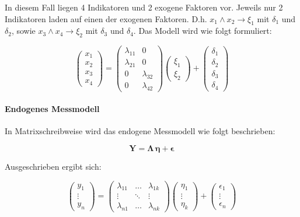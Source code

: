 \documentclass{article}
\numberwithin{equation}{section}
\begin{document}
In diesem Fall liegen 4 Indikatoren und 2 exogene Faktoren vor. Jeweils nur 2 Indikatoren laden auf einen der exogenen Faktoren. D.h. $x_1 \wedge x_2 \to \xi_1$ mit $\delta_1$ und $\delta_2$, sowie $x_3 \wedge x_4 \to \xi_2$ mit $\delta_3$ und $\delta_4$. Das Modell wird wie folgt formuliert:

\begin{equation}
\begin{pmatrix}x_1\\ x_2\\ x_3\\ x_4\end{pmatrix} = 
\begin{pmatrix}\lambda_{11} & 0\\ \lambda_{21} & 0 \\ 0 & \lambda_{32}\\ 0 & \lambda_{42} \end{pmatrix}
\begin{pmatrix}\xi_1\\ \xi_2\end{pmatrix} +
\begin{pmatrix}\delta_1\\ \delta_2\\ \delta_3\\ \delta_4\end{pmatrix}
\end{equation}

\paragraph*{Endogenes Messmodell}

In Matrixschreibweise wird das endogene Messmodell wie folgt beschrieben:

\begin{equation}
\mathbf{Y} = \boldsymbol{\Lambda \, \eta} + \boldsymbol\epsilon
\end{equation}

Ausgeschrieben ergibt sich:

\begin{equation}
\begin{pmatrix}y_1\\ \vdots\\ y_n\end{pmatrix} = 
\begin{pmatrix}\lambda_{11} & \hdots & \lambda_{1k}\\ \vdots & \ddots & \vdots \\ \lambda_{n1} & \hdots & \lambda_{nk} \end{pmatrix}
\begin{pmatrix}\eta_1\\ \vdots\\ \eta_k\end{pmatrix} +
\begin{pmatrix}\epsilon_1\\ \vdots\\ \epsilon_n\end{pmatrix}
\end{equation}
\end{document}
